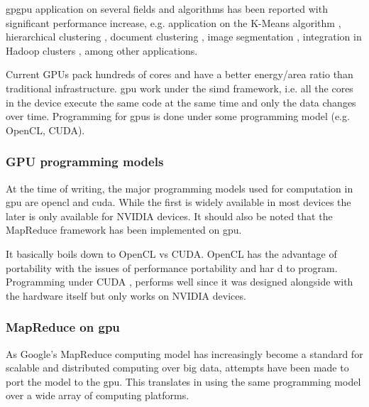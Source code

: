 \gls{gpgpu} application on several fields and algorithms has been reported with significant performance increase, e.g. application on the K-Means algorithm \cite{Bai2009,Wu2011,Zechner2009,Wu2009a}, hierarchical clustering \cite{Shalom2009,ArulShalom2011}, document clustering \cite{gao20xx}, image segmentation \cite{Sirotkovi2012}, integration in Hadoop clusters \cite{Malakar2013,Grossman2013}, among other applications.

Current GPUs pack hundreds of cores and have a better energy/area ratio than traditional infrastructure.
\gls{gpu} work under the \gls{simd} framework, i.e. all the cores in the device execute the same code at the same time and only the data changes over time. Programming for \gls{gpu}s is done under some programming model (e.g. OpenCL, CUDA).



\subsubsection{GPU programming models}

At the time of writing, the major programming models used for computation in \gls{gpu} are \gls{opencl} and \gls{cuda}. While the first is widely available in most devices the later is only available for NVIDIA devices.
It should also be noted that the MapReduce framework has been implemented on \gls{gpu}.


It basically boils down to OpenCL vs CUDA. OpenCL has the advantage of portability with the issues of performance portability and har d to program. Programming under CUDA , performs well since it was designed alongside with the hardware itself but only works on NVIDIA devices.


\subsubsection{MapReduce on \gls{gpu}}
As Google's MapReduce computing model has increasingly become a standard for scalable and distributed computing over big data, attempts have been made to port the model to the \gls{gpu}. This translates in using the same programming model over a wide array of computing platforms.



